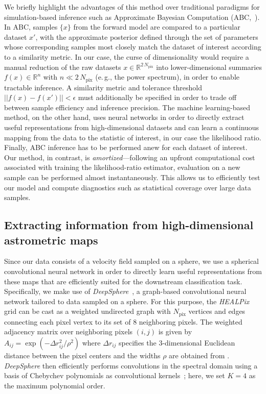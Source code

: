\documentclass[twocolumn,linenumbers,anonymous]{aastex631}
\newcommand{\package}[1]{\textsl{#1}\xspace}
\newcommand{\eg}{{e.\,g.}\xspace}
\newcommand{\healpix}{\package{HEALPix}}
\newcommand{\deepsphere}{\package{DeepSphere}}
\newcommand{\changes}[1]{{{\color{red}#1}}}
\begin{document}
\changes{We briefly highlight the advantages of this method over traditional paradigms for simulation-based inference such as Approximate Bayesian Computation (ABC,~\citet{10.1214/aos/1176346785,sisson2018handbook}). In ABC, samples $\{x\}$ from the forward model are compared to a particular dataset $x'$, with the approximate posterior defined through the set of parameters whose corresponding samples most closely match the dataset of interest according to a similarity metric. In our case, the curse of dimensionality would require a manual reduction of the raw datasets $x\in\mathbb R^{2\,N_\mathrm{pix}}$ into lower-dimensional summaries $f(x)\in\mathbb R^{n}$ with $n \ll 2\,N_\mathrm{pix}$ (\eg, the power spectrum), in order to enable tractable inference. A similarity metric and tolerance threshold $||f(x)-f(x')|| < \epsilon$ must additionally be specified in order to trade off between sample efficiency and inference precision. The machine learning-based method, on the other hand, uses neural networks in order to directly extract useful representations from high-dimensional datasets and can learn a continuous mapping from the data to the statistic of interest, in our case the likelihood ratio. Finally, ABC inference has to be performed anew for each dataset of interest. Our method, in contrast, is \emph{amortized}---following an upfront computational cost associated with training the likelihood-ratio estimator, evaluation on a new sample can be performed almost instantaneously. This allows us to efficiently test our model and compute diagnostics such as statistical coverage over large data samples.}

\subsection{Extracting information from high-dimensional astrometric maps} 

Since our data consists of a velocity field sampled on a sphere, we use a spherical convolutional neural network in order to directly learn useful representations from these maps that are efficiently suited for the downstream classification task. Specifically, we make use of \deepsphere~\citep{2020arXiv201215000D,deepsphere_cosmo}, a graph-based convolutional neural network tailored to data sampled on a sphere. For this purpose, the \healpix grid can be cast as a weighted undirected graph with $N_\mathrm{pix}$ vertices and edges connecting each pixel vertex to its set of 8 neighboring pixels. The weighted adjacency matrix over neighboring pixels $(i, j)$ is given by $A_{ij} = \exp \left(-{\Delta r_{ij}^{2}}/{\rho^{2}}\right)$ where $\Delta r_{ij}$ specifies the 3-dimensional Euclidean distance between the pixel centers and the widths $\rho$ are obtained from \citet{2020arXiv201215000D}. \deepsphere then efficiently performs convolutions in the spectral domain using a basis of Chebychev polynomials as convolutional kernels~\citep{2016arXiv160609375D}; here, we set $K=4$ as the maximum polynomial order. 
\end{document}
